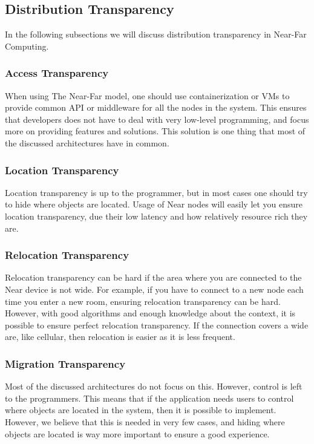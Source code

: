 \subsection{Distribution Transparency}
In the following subsections we will discuss distribution transparency in Near-Far Computing.

\subsubsection{Access Transparency}
When using The Near-Far model, one should use containerization or VMs to provide common API or middleware for all the nodes in the system. This ensures that developers does not have to deal with very low-level programming, and focus more on providing features and solutions. This solution is one thing that most of the discussed architectures have in common.

\subsubsection{Location Transparency}
Location transparency is up to the programmer, but in most cases one should try to hide where objects are located. Usage of Near nodes will easily let you ensure location transparency, due their low latency and how relatively resource rich they are.

\subsubsection{Relocation Transparency}
Relocation transparency can be hard if the area where you are connected to the Near device is not wide. For example, if you have to connect to a new node each time you enter a new room, ensuring relocation transparency can be hard. However, with good algorithms and enough knowledge about the context, it is possible to ensure perfect relocation transparency. If the connection covers a wide are, like cellular, then relocation is easier as it is less frequent.

\subsubsection{Migration Transparency}
Most of the discussed architectures do not focus on this. However, control is left to the programmers. This means that if the application needs users to control where objects are located in the system, then it is possible to implement. However, we believe that this is needed in very few cases, and hiding where objects are located is way more important to ensure a good experience.

